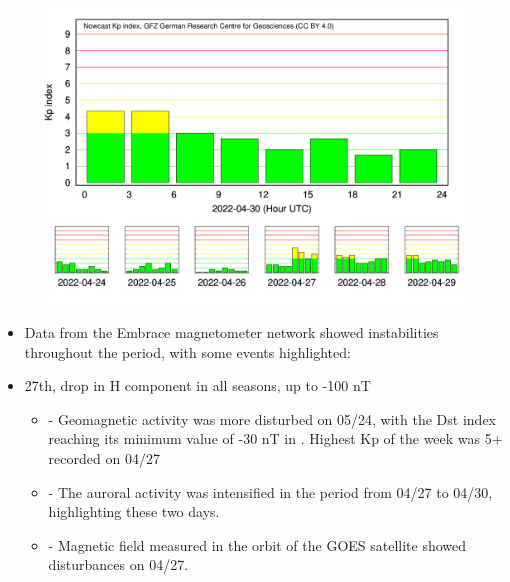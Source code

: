 \documentclass[11pt, oneside]{article}
\begin{document}
                     \begin{figure}[H]
    
                        \centering
   
                             \includegraphics[width=14cm]{./figures/figureGeomag_7.png}

                        \end{figure}

                     \begin{itemize} 
\item Data from the Embrace magnetometer network showed instabilities throughout the period, with some events highlighted:
\item 27th, drop in H component in all seasons, up to -100 nT
\begin{itemize} 
 \item - Geomagnetic activity was more disturbed on 05/24, with the Dst index reaching its minimum value of -30 nT in . Highest Kp of the week was 5+ recorded on 04/27
 \end{itemize} 
\begin{itemize} 
 \item - The auroral activity was intensified in the period from 04/27 to 04/30, highlighting these two days.
 \end{itemize} 
\begin{itemize} 
 \item - Magnetic field measured in the orbit of the GOES satellite showed disturbances on 04/27.
 \end{itemize} 
\end{itemize} 
\end{document}

